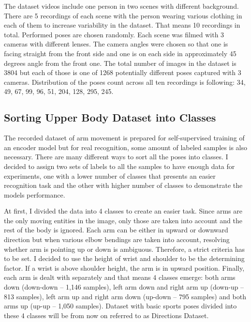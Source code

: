 The dataset videos include one person in two scenes with different background. There are 5 recordings of each scene with the person wearing various clothing in each of them to increase variability in the dataset. That means 10 recordings in total. Performed poses are chosen randomly. Each scene was filmed with 3 cameras with different lenses. The camera angles were chosen so that one is facing straight from the front side and one is on each side in approximately 45 degrees angle from the front one. The total number of images in the dataset is 3804 but each of those is one of 1268 potentially different poses captured with 3 cameras. Distribution of the poses count across all ten recordings is following: 34, 49, 67, 99, 96, 51, 204, 128, 295, 245.

\subsection{Sorting Upper Body Dataset into Classes}

The recorded dataset of arm movement is prepared for self-supervised training of an encoder model but for real recognition, some amount of labeled samples is also necessary. There are many different ways to sort all the poses into classes. I decided to assign two sets of labels to all the samples to have enough data for experiments, one with a lower number of classes that presents an easier recognition task and the other with higher number of classes to demonstrate the models performance.

At first, I divided the data into 4 classes to create an easier task. Since arms are the only moving entities in the image, only those are taken into account and the rest of the body is ignored. Each arm can be either in upward or downward direction but when various elbow bendings are taken into account, resolving whether arm is pointing up or down is ambiguous. Therefore, a strict criteria has to be set. I decided to use the height of wrist and shoulder to be the determining factor. If a wrist is above shoulder height, the arm is in upward position. Finally, each arm is dealt with separately and that means 4 classes emerge: both arms down (down-down -- 1,146 samples), left arm down and right arm up (down-up -- 813 samples), left arm up and right arm down (up-down -- 795 samples) and both arms up (up-up -- 1,050 samples). Dataset with basic sports poses divided into these 4 classes will be from now on referred to as Directions Dataset.

